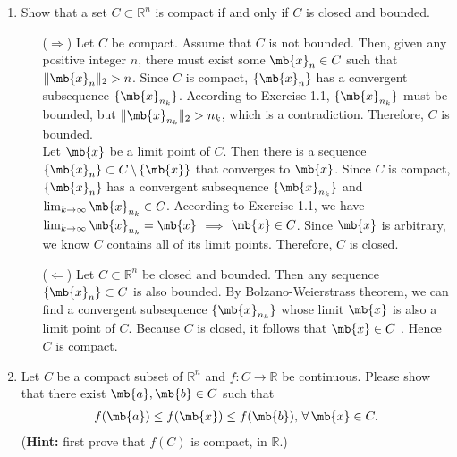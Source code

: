 \newpage
\begin{exercise}
	\begin{enumerate}
		\item Show that a set $C \subset \mathbb{R}^n$ is compact if and only if $C$ is closed and bounded.

			\begin{solution}
				\begin{itemize}
					\item []
					\item [($\Rightarrow$)]
						Let $C$ be compact.
						Assume that $C$ is not bounded.
						Then, given any positive integer $n$, there must exist some $\mb{x}_n \in C$ such that $\|\mb{x}_n\|_2 > n$.
						Since $C$ is compact, $\{\mb{x}_n\}$ has a convergent subsequence $\{\mb{x}_{n_k}\}$.
						According to Exercise 1.1, $\{\mb{x}_{n_k}\}$ must be bounded, but $\|\mb{x}_{n_k}\|_2 > n_k$, which is a contradiction.
						Therefore, $C$ is bounded.\\
						Let $\mb{x}$ be a limit point of $C$.
						Then there is a sequence $\{\mb{x}_n\}\subset C \,\backslash\, \{\mb{x}\}$ that converges to $\mb{x}$.
						Since $C$ is compact, $\{\mb{x}_n\}$ has a convergent subsequence $\{\mb{x}_{n_k}\}$ and $\lim_{k\to\infty}\mb{x}_{n_k}\in C$.
						According to Exercise 1.1, we have $\lim_{k\to\infty}\mb{x}_{n_k}=\mb{x}$ $\implies$ $\mb{x}\in C$.
						Since $\mb{x}$ is arbitrary, we know $C$ contains all of its limit points.
						Therefore, $C$ is closed.

					\item [($\Leftarrow$)]
						Let $C \subset \mathbb{R}^n$ be closed and bounded.
						Then any sequence $\{\mb{x}_n\} \subset C$ is also bounded. By Bolzano-Weierstrass theorem, we can find a convergent subsequence $\{\mb{x}_{n_k}\}$ whose limit $\mb{x}$ is also a limit point of $C$. Because $C$ is closed, it follows that $\mb{x}\in C$ . Hence $C$ is compact.
						\qedhere
				\end{itemize}
			\end{solution}

		\item Let $C$ be a compact subset of $\mathbb{R}^n$ and $f:C \rightarrow \mathbb{R}$ be continuous. Please show that there exist $\mb{a},\mb{b} \in C$ such that
			\begin{align*}
				f(\mb{a}) \leq f(\mb{x}) \leq f(\mb{b}),\,\forall\,\mb{x}\in C.
			\end{align*}
			(\textbf{Hint:} first prove that $f(C)$ is compact, in $\mathbb{R}$.)


\end{enumerate}
\end{exercise}
